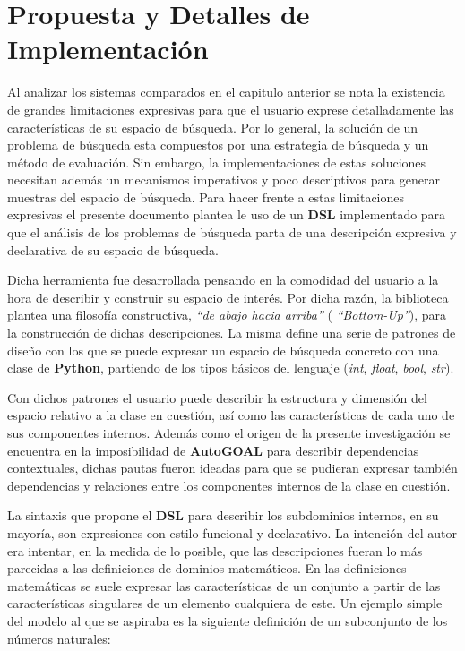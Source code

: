 \chapter{Propuesta y Detalles de Implementación}\label{chapter:proposal}

Al analizar los sistemas comparados en el capitulo anterior se nota la existencia
de grandes limitaciones expresivas para que el usuario exprese detalladamente las
características de su espacio de búsqueda. Por lo general, la solución de un problema de 
búsqueda esta compuestos por una estrategia de búsqueda y un método de evaluación. 
Sin embargo, la implementaciones de estas soluciones necesitan además un mecanismos 
imperativos y poco descriptivos para generar muestras del espacio de búsqueda. 
Para hacer frente a estas limitaciones expresivas el presente documento plantea le 
uso de un {\bf DSL} implementado para que el análisis de los problemas de búsqueda 
parta de una descripción expresiva y declarativa de su espacio de búsqueda.

Dicha herramienta fue desarrollada pensando en la comodidad del usuario a la hora de
describir y construir su espacio de interés. Por dicha razón, la biblioteca plantea
una filosofía constructiva, {\it “de abajo hacia arriba”} ({ \it “Bottom-Up”}), para la
construcción de dichas descripciones. La misma define una serie de patrones de diseño
con los que se puede expresar un espacio de búsqueda concreto con una clase de {\bf Python}, 
partiendo de los tipos básicos del lenguaje ({\it int}, {\it float}, {\it bool}, {\it str}).

Con dichos patrones el usuario puede describir la estructura y dimensión del espacio
relativo a la clase en cuestión, así como las características de cada uno de sus
componentes internos. Además como el origen de la presente investigación se encuentra
en la imposibilidad de {\bf AutoGOAL} para describir dependencias contextuales, dichas pautas
fueron ideadas para que se pudieran expresar también dependencias y relaciones entre los
componentes internos de la clase en cuestión.

La sintaxis que propone el {\bf DSL} para describir los subdominios internos, en su mayoría,
son expresiones con estilo funcional y declarativo. La intención del autor era intentar,
en la medida de lo posible, que las descripciones fueran lo más parecidas a las definiciones
de dominios matemáticos. En las definiciones matemáticas se suele expresar las características
de un conjunto a partir de las características singulares de un elemento cualquiera de este.
Un ejemplo simple del modelo al que se aspiraba es la siguiente definición de un subconjunto de
los números naturales:

